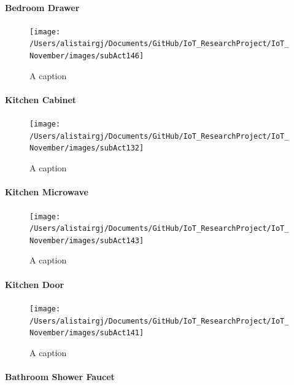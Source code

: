 \documentclass[11pt,]{article}
\let\oldparagraph\paragraph
\renewcommand{\paragraph}[1]{\oldparagraph{#1}\mbox{}}
\begin{document}
\hypertarget{bedroom-drawer}{%
\paragraph{Bedroom Drawer}\label{bedroom-drawer}}

\begin{figure}[H]
\texttt{[image: /Users/alistairgj/Documents/GitHub/IoT\_ResearchProject/IoT\_November/images/subAct146]} \caption{A caption}\label{fig:subAct146}
\end{figure}

\hypertarget{kitchen-cabinet}{%
\paragraph{Kitchen Cabinet}\label{kitchen-cabinet}}

\begin{figure}[H]
\texttt{[image: /Users/alistairgj/Documents/GitHub/IoT\_ResearchProject/IoT\_November/images/subAct132]} \caption{A caption}\label{fig:subAct132}
\end{figure}

\hypertarget{kitchen-microwave}{%
\paragraph{Kitchen Microwave}\label{kitchen-microwave}}

\begin{figure}[H]
\texttt{[image: /Users/alistairgj/Documents/GitHub/IoT\_ResearchProject/IoT\_November/images/subAct143]} \caption{A caption}\label{fig:subAct143}
\end{figure}

\hypertarget{kitchen-door}{%
\paragraph{Kitchen Door}\label{kitchen-door}}

\begin{figure}[H]
\texttt{[image: /Users/alistairgj/Documents/GitHub/IoT\_ResearchProject/IoT\_November/images/subAct141]} \caption{A caption}\label{fig:subAct141}
\end{figure}

\hypertarget{bathroom-shower-faucet}{%
\paragraph{Bathroom Shower Faucet}\label{bathroom-shower-faucet}}
\end{document}
